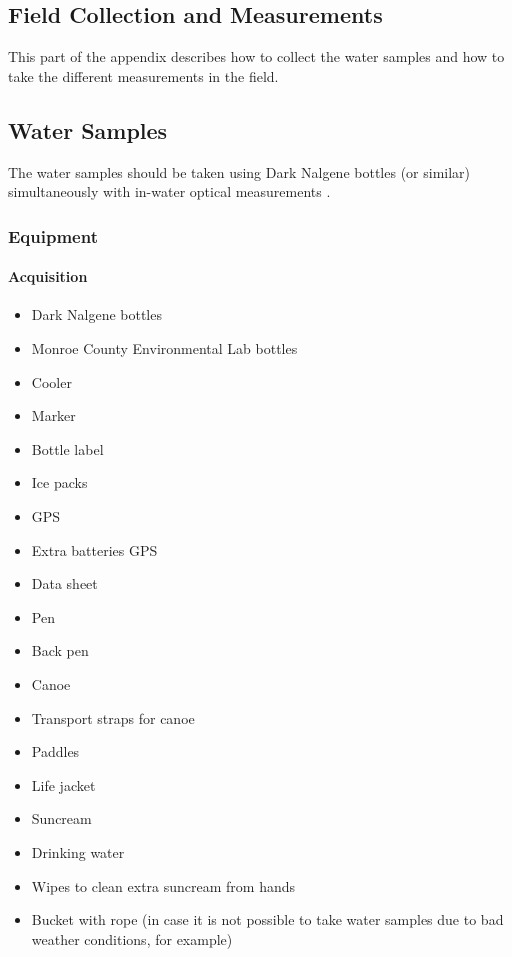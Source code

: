 \begin{appendices}
\chapter{Field Collection and Measurements}
\label{ch:fieldmea}

This part of the appendix describes how to collect the water samples and how to take the different measurements in the field.
\section{Water Samples}
The water samples should be taken using Dark Nalgene bottles (or similar) simultaneously with in-water optical measurements \citep{Mitchell2002}.

\subsection{Equipment}
\subsubsection*{Acquisition}

\begin{multicols}{3}
\begin{itemize}[itemsep=2pt,parsep=2pt]
  \item Dark Nalgene bottles
  \item Monroe County Environmental Lab bottles
  \item Cooler
  \item Marker
  \item Bottle label
  \item Ice packs
  \item GPS
  \item Extra batteries GPS
  \item Data sheet
  \item Pen
  \item Back pen
  \item Canoe 
  \item Transport straps for canoe
  \item Paddles
  \item Life jacket
  \item Suncream 
  \item Drinking water
  \item Wipes to clean extra suncream from hands
  \item Bucket with rope (in case it is not possible to take water samples due to bad weather conditions, for example)
\end{itemize}
\end{multicols}


\end{appendices}
